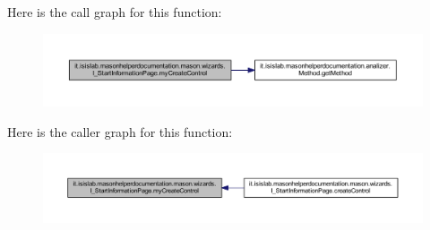 Here is the call graph for this function\-:
\nopagebreak
\begin{figure}[H]
\begin{center}
\leavevmode
\includegraphics[width=350pt]{classit_1_1isislab_1_1masonhelperdocumentation_1_1mason_1_1wizards_1_1_i___start_information_page_a11ff2fb4c6af0ac2cc873e0b56553c55_cgraph}
\end{center}
\end{figure}




Here is the caller graph for this function\-:
\nopagebreak
\begin{figure}[H]
\begin{center}
\leavevmode
\includegraphics[width=350pt]{classit_1_1isislab_1_1masonhelperdocumentation_1_1mason_1_1wizards_1_1_i___start_information_page_a11ff2fb4c6af0ac2cc873e0b56553c55_icgraph}
\end{center}
\end{figure}




